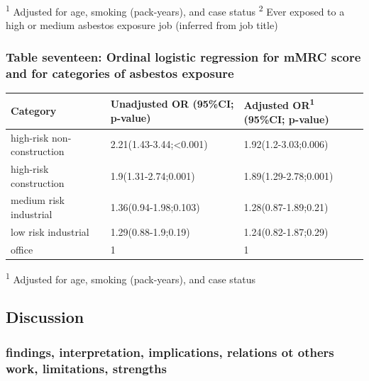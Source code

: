 \documentclass[
]{article}
\begin{document}
\textsuperscript{1} Adjusted for age, smoking (pack-years), and case
status \textsuperscript{2} Ever exposed to a high or medium asbestos
exposure job (inferred from job title)

\hypertarget{table-seventeen-ordinal-logistic-regression-for-mmrc-score-and-for-categories-of-asbestos-exposure}{%
\subsubsection{Table seventeen: Ordinal logistic regression for mMRC
score and for categories of asbestos
exposure}\label{table-seventeen-ordinal-logistic-regression-for-mmrc-score-and-for-categories-of-asbestos-exposure}}

\begin{longtable}[]{@{}lll@{}}
\toprule
Category & Unadjusted OR (95\%CI; p-value) & Adjusted
OR\textsuperscript{1} (95\%CI; p-value)\tabularnewline
\midrule
\endhead
high-risk non-construction & 2.21(1.43-3.44;\textless0.001) &
1.92(1.2-3.03;0.006)\tabularnewline
high-risk construction & 1.9(1.31-2.74;0.001) &
1.89(1.29-2.78;0.001)\tabularnewline
medium risk industrial & 1.36(0.94-1.98;0.103) &
1.28(0.87-1.89;0.21)\tabularnewline
low risk industrial & 1.29(0.88-1.9;0.19) &
1.24(0.82-1.87;0.29)\tabularnewline
office & 1 & 1\tabularnewline
\bottomrule
\end{longtable}

\textsuperscript{1} Adjusted for age, smoking (pack-years), and case
status

\hypertarget{discussion-3}{%
\subsection{Discussion}\label{discussion-3}}

\hypertarget{findings-interpretation-implications-relations-ot-others-work-limitations-strengths}{%
\subsubsection{findings, interpretation, implications, relations ot
others work, limitations,
strengths}\label{findings-interpretation-implications-relations-ot-others-work-limitations-strengths}}
\end{document}
